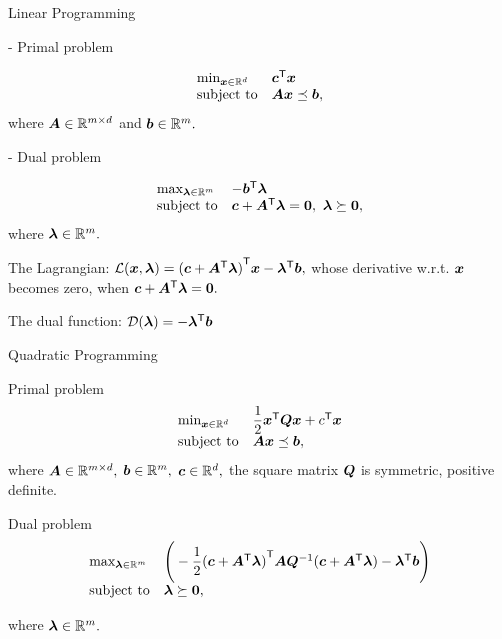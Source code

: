 \documentclass[handout,fleqn,aspectratio=169]{beamer}
\begin{document}
\begin{frame}{Linear Programming}

{
- Primal problem

$$
\begin{array}{ll}
\mbox{min}_{\bm{x} \in {\mathbb R}^d} & {\bm{c}}^{\mathsf{T}}\bm{x} \\
\mbox{subject to} & \bm{A} \bm{x} \preceq \bm{b},  
\end{array}
$$
where $\bm{A} \in {\mathbb R}^{m \times d}$ and $\bm{b} \in {\mathbb R}^{m}.$
}
{
- Dual problem

$$
\displaystyle
\begin{array}{ll}
\text{max}_{\bm{\lambda} \in {\mathbb R}^m} & -{\bm{b}}^{\mathsf{T}}\bm{\lambda} \\
\mbox{subject to} & \bm{c} + {\bm{A}}^{\mathsf{T}}\bm{\lambda} = \bm{0}, \ \bm{\lambda} \succeq \bm{0},
\end{array}
$$
where $\bm{\lambda} \in {\mathbb R}^{m}.$
}

\plitemsep 0.1in
\bci 

\item The Lagrangian: ${\cal L}(\bm{x}, \bm{\lambda}) = {(\bm{c} + {\bm{A}}^{\mathsf{T}}\bm{\lambda})}^{\mathsf{T}}\bm{x} - {\bm{\lambda}}^{\mathsf{T}} \bm{b},$ 
whose derivative w.r.t. $\bm{x}$ becomes zero, when $\bm{c} + {\bm{A}}^{\mathsf{T}}\bm{\lambda} = \bm{0}.$

\item The dual function: ${\cal D}(\bm{\lambda}) = -{\bm{\lambda}}^{\mathsf{T}} \bm{b}$
\eci

\end{frame}

\begin{frame}{Quadratic Programming}

\plitemsep 0.1in
\bci 

\item Primal problem
$$\begin{array}{ll}
\mbox{min}_{\bm{x} \in {\mathbb R}^d} & \dfrac{1}{2} {\bm{x}}^{\mathsf{T}}\bm{Q} \bm{x} + {c}^{\mathsf{T}}\bm{x} \\
\mbox{subject to} & \bm{A} \bm{x} \preceq \bm{b},  
\end{array}
$$
where $\bm{A} \in {\mathbb R}^{m \times d},$ $\bm{b} \in {\mathbb R}^{m},$ $\bm{c} \in {\mathbb R}^d,$ the square matrix $\bm{Q}$ is symmetric, positive definite. 

\item Dual problem
$$
\begin{array}{ll}
\text{max}_{\bm{\lambda} \in {\mathbb R}^m} & \Bigg(-\dfrac{1}{2}{(\bm{c} + {\bm{A}}^{\mathsf{T}}\bm{\lambda})}^{\mathsf{T}}\bm{A}{{\bm{Q}}^{-1}}(\bm{c} + {\bm{A}}^{\mathsf{T}}\bm{\lambda}) -{\bm{\lambda}}^{\mathsf{T}}\bm{b} \Bigg )\\
\text{subject to} & \bm{\lambda} \succeq \bm{0},
\end{array}
$$

where $\bm{\lambda} \in {\mathbb R}^{m}.$

\eci

\end{frame}
\end{document}
